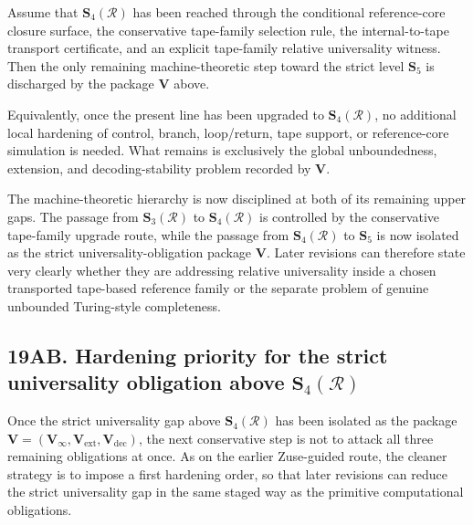 \begin{proposition}
Assume that \(\mathbf S_4(\mathcal R)\) has been reached through the conditional reference-core closure surface, the conservative tape-family selection rule, the internal-to-tape transport certificate, and an explicit tape-family relative universality witness. Then the only remaining machine-theoretic step toward the strict level \(\mathbf S_5\) is discharged by the package \(\mathbf V\) above.

Equivalently, once the present line has been upgraded to \(\mathbf S_4(\mathcal R)\), no additional local hardening of control, branch, loop/return, tape support, or reference-core simulation is needed. What remains is exclusively the global unboundedness, extension, and decoding-stability problem recorded by \(\mathbf V\).
\end{proposition}

\begin{corollary}
The machine-theoretic hierarchy is now disciplined at both of its remaining upper gaps. The passage from \(\mathbf S_3(\mathcal R)\) to \(\mathbf S_4(\mathcal R)\) is controlled by the conservative tape-family upgrade route, while the passage from \(\mathbf S_4(\mathcal R)\) to \(\mathbf S_5\) is now isolated as the strict universality-obligation package \(\mathbf V\). Later revisions can therefore state very clearly whether they are addressing relative universality inside a chosen transported tape-based reference family or the separate problem of genuine unbounded Turing-style completeness.
\end{corollary}


\subsection*{19AB. Hardening priority for the strict universality obligation above \(\mathbf S_4(\mathcal R)\)}
Once the strict universality gap above \(\mathbf S_4(\mathcal R)\) has been isolated as the package \(\mathbf V=(\mathbf V_\infty,\mathbf V_{\mathrm{ext}},\mathbf V_{\mathrm{dec}})\), the next conservative step is not to attack all three remaining obligations at once. As on the earlier Zuse-guided route, the cleaner strategy is to impose a first hardening order, so that later revisions can reduce the strict universality gap in the same staged way as the primitive computational obligations.

